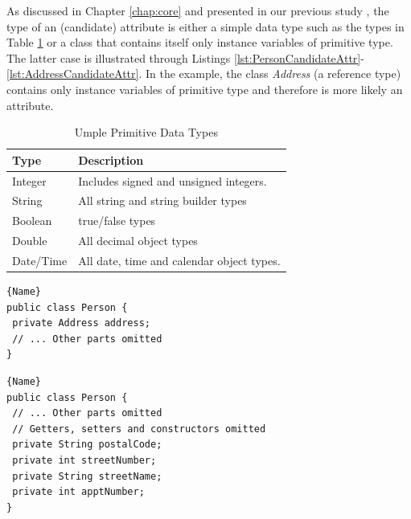 As discussed in Chapter \ref{chap:core} and presented in our previous study \cite{UmpleAttributes}, the type of an (candidate) attribute is either a simple data type such as the types in Table \ref{table:attributes2} or a class that contains itself only instance variables of primitive type. The latter case is illustrated through Listings \ref{lst:PersonCandidateAttr}-\ref{lst:AddressCandidateAttr}. In the example, the class \textit{Address} (a reference type) contains only instance variables of primitive type and therefore is more likely an attribute. 

\begin{table}
\caption{Umple Primitive Data Types}
\label{table:attributes2}
\centering
    \begin{tabular}{ll}
		\toprule
		\rowcolor[HTML]{BBDAFF}
        \textbf{Type}      & \textbf{Description}                               \\ 
        \hline
        Integer   & Includes signed and unsigned integers.    \\ 
        String    & All string and string builder types       \\ 
        Boolean   & true/false types                          \\ 
        Double    & All decimal object types                  \\ 
        Date/Time & All date, time and calendar object types. \\
        \hline
    \end{tabular}
\end{table}

\noindent\begin{minipage}{.45\textwidth}
\begin{lstlisting}[style=java,caption=Person.java,label=lst:PersonCandidateAttr]{Name}
public class Person {
 private Address address;
 // ... Other parts omitted
}
\end{lstlisting}
\end{minipage}\hfill
\begin{minipage}{.45\textwidth}
\begin{lstlisting}[style=java,caption=Address.java,label=lst:AddressCandidateAttr]{Name}
public class Person {
 // ... Other parts omitted
 // Getters, setters and constructors omitted
 private String postalCode;
 private int streetNumber;
 private String streetName;
 private int apptNumber;
}
\end{lstlisting}
\end{minipage}

